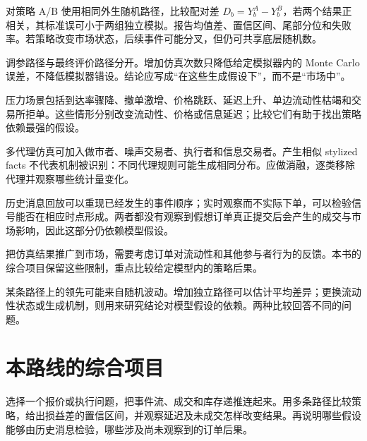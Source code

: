对策略 A/B 使用相同外生随机路径，比较配对差 $D_b=Y_b^A-Y_b^B$，若两个结果正相关，其标准误可小于两组独立模拟。报告均值差、置信区间、尾部分位和失败率。若策略改变市场状态，后续事件可能分叉，但仍可共享底层随机数。

调参路径与最终评价路径分开。增加仿真次数只降低给定模拟器内的 Monte Carlo 误差，不降低模拟器错设。结论应写成“在这些生成假设下”，而不是“市场中”。


压力场景包括到达率骤降、撤单激增、价格跳跃、延迟上升、单边流动性枯竭和交易所拒单。这些情形分别改变流动性、价格或信息延迟；比较它们有助于找出策略依赖最强的假设。

多代理仿真可加入做市者、噪声交易者、执行者和信息交易者。产生相似 stylized facts 不代表机制被识别：不同代理规则可能生成相同分布。应做消融，逐类移除代理并观察哪些统计量变化。


历史消息回放可以重现已经发生的事件顺序；实时观察而不实际下单，可以检验信号能否在相应时点形成。两者都没有观察到假想订单真正提交后会产生的成交与市场影响，因此这部分仍依赖模型假设。

把仿真结果推广到市场，需要考虑订单对流动性和其他参与者行为的反馈。本书的综合项目保留这些限制，重点比较给定模型内的策略后果。

\begin{diagnostic}
某条路径上的领先可能来自随机波动。增加独立路径可以估计平均差异；更换流动性状态或生成机制，则用来研究结论对模型假设的依赖。两种比较回答不同的问题。
\end{diagnostic}

\section{本路线的综合项目}

选择一个报价或执行问题，把事件流、成交和库存递推连起来。用多条路径比较策略，给出损益差的置信区间，并观察延迟及未成交怎样改变结果。再说明哪些假设能够由历史消息检验，哪些涉及尚未观察到的订单后果。




